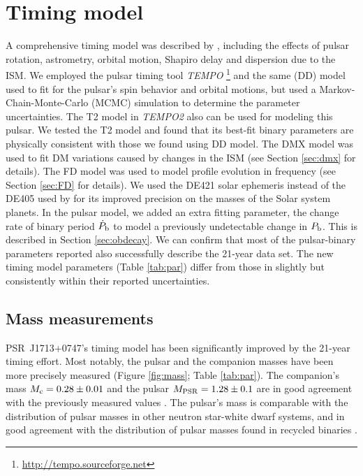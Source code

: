 \section{Timing model}
\label{sec:model}
A comprehensive timing model was described by \citet{sns+05},
including the effects of pulsar rotation, astrometry, orbital motion,
Shapiro delay and dispersion due to the ISM.
We employed the pulsar timing tool \textit{TEMPO}
\footnote{\url{http://tempo.sourceforge.net}} and the same
\citet{dd86} (DD) model \citet{sns+05} used to fit for the pulsar's
spin behavior and orbital motions, but used a Markov-Chain-Monte-Carlo
(MCMC) simulation to determine the parameter uncertainties.
The T2 model in \textit{TEMPO2} \citep{hem06} also can be used for modeling this pulsar. We tested the T2 model and found that its best-fit binary parameters are physically consistent with those we found using DD model.
The DMX model was used to fit DM variations caused by changes in the ISM (see Section \ref{sec:dmx} for details). The FD model was used to model profile
evolution in frequency (see Section \ref{sec:FD} for details). 
We used the DE421 solar ephemeris instead of the DE405 used by
\citet{sns+05} for its improved precision on the masses of the Solar system planets. 
In the pulsar model, we added an extra fitting parameter, the change rate of binary period $\dot{P}_{\rm b}$ to model a previously undetectable change in $P_{\rm b}$. This is described in Section \ref{sec:obdecay}.    
We can confirm that most of the pulsar-binary parameters reported
\citet{sns+05} also successfully describe the 21-year data
set. The new timing model parameters (Table \ref{tab:par}) differ from
those in \citet{sns+05} slightly but consistently within their reported uncertainties.



\subsection{Mass measurements}
\label{sec:mass}
PSR~J1713+0747's timing model has been significantly improved by the 21-year timing effort.
Most notably, the pulsar and the companion masses have been more precisely measured
(Figure \ref{fig:mass}; Table \ref{tab:par}). The
companion's mass $M_{\rm c} = 0.28\pm0.01$ and the pulsar $M_{\rm PSR}=1.28\pm0.1$ are in good agreement with the previously measured values \cite{sns+05}.
The pulsar's mass is comparable with the distribution of pulsar masses
in other neutron star-white dwarf systems, and in good
agreement with the distribution of pulsar masses found in recycled binaries
\citep{opns12,kkdt13}.


